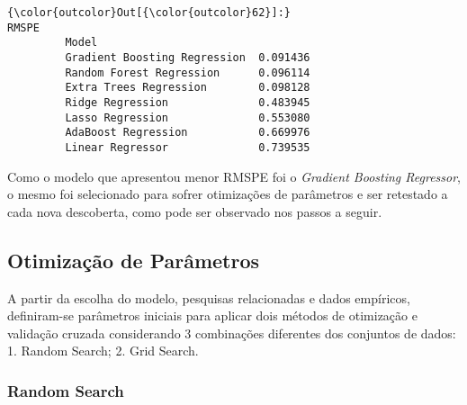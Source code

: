 \documentclass[11pt]{article}
\begin{document}
\begin{Verbatim}[commandchars=\\\{\}]
{\color{outcolor}Out[{\color{outcolor}62}]:}                                  RMSPE
         Model                                 
         Gradient Boosting Regression  0.091436
         Random Forest Regression      0.096114
         Extra Trees Regression        0.098128
         Ridge Regression              0.483945
         Lasso Regression              0.553080
         AdaBoost Regression           0.669976
         Linear Regressor              0.739535
\end{Verbatim}
            
    Como o modelo que apresentou menor RMSPE foi o \emph{Gradient Boosting
Regressor}, o mesmo foi selecionado para sofrer otimizações de
parâmetros e ser retestado a cada nova descoberta, como pode ser
observado nos passos a seguir.

    \hypertarget{otimizauxe7uxe3o-de-paruxe2metros}{%
\subsection{Otimização de
Parâmetros}\label{otimizauxe7uxe3o-de-paruxe2metros}}

    A partir da escolha do modelo, pesquisas relacionadas e dados empíricos,
definiram-se parâmetros iniciais para aplicar dois métodos de otimização
e validação cruzada considerando 3 combinações diferentes dos conjuntos
de dados: 1. Random Search; 2. Grid Search.

    \hypertarget{random-search}{%
\subsubsection{Random Search}\label{random-search}}
\end{document}
